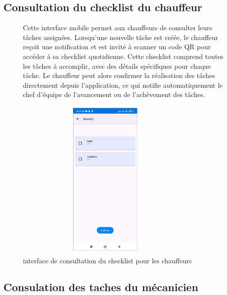 \subsection{Consultation du checklist du chauffeur}

\begin{figure}[htbp]
  \centering
  \begin{minipage}{0.58\textwidth}
    \raggedright
    Cette interface mobile permet aux chauffeurs de consulter leurs tâches assignées. Lorsqu'une nouvelle tâche est créée, le chauffeur reçoit une notification et est invité à scanner un code QR pour accéder à sa checklist quotidienne. Cette checklist comprend toutes les tâches à accomplir, avec des détails spécifiques pour chaque tâche. Le chauffeur peut alors confirmer la réalisation des tâches directement depuis l'application, ce qui notifie automatiquement le chef d'équipe de l'avancement ou de l'achèvement des tâches.
  \end{minipage}
  \hfill
  \begin{minipage}{0.39\textwidth}
    \centering
    \includegraphics[width=0.8\textwidth,height=8cm]{chap4.images/consultation du checklist.png}
    \caption{interface de consultation du checklist pour les chauffeurs }
  \end{minipage}
\end{figure}

\newpage

\subsection{Consulation des taches du mécanicien }


